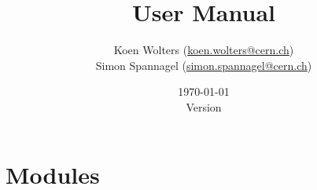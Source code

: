 \documentclass[fontsize=12pt, parskip=half]{scrartcl}
\title{\apsqbold User Manual} %
\author{Koen Wolters (\href{mailto:koen.wolters@cern.ch}{koen.wolters@cern.ch})\\
  Simon Spannagel (\href{mailto:simon.spannagel@cern.ch}{simon.spannagel@cern.ch})
} %
\date{\today\\ \vspace{10pt} Version \version} %
\begin{document}
\maketitle %

\addlicense

\begin{abstract}
\end{abstract}

\clearpage
\tableofcontents

\clearpage


\clearpage


\clearpage


\clearpage


\clearpage


\clearpage


\clearpage

\section{Modules}
\label{sec:modules}

\lstset{language=Ini}
\lstset{language=}
\clearpage


\clearpage


\clearpage


\clearpage


\clearpage

\appendix

% 

\clearpage
{}
\addreferencesline
\printbibliography
\end{document}
